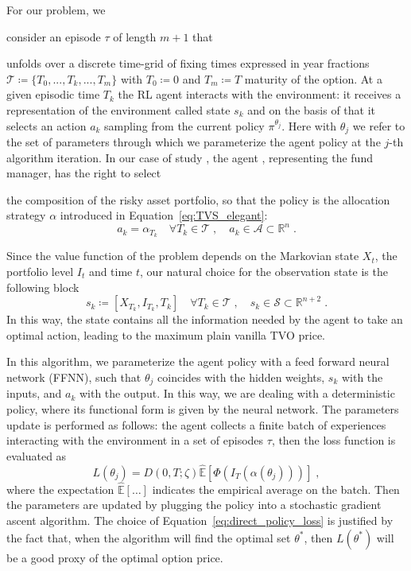 \documentclass[runningheads]{m2ef}
\newcommand\soutpars[1]{\let\helpcmd\sout\parhelp#1\par\relax\relax}
\newcommand{\change}[1]{{\color{red} {#1}}}%
\newcommand{\remove}[1]{{\color{red} \soutpars{{#1}}}}%
\begin{document}
\change{For our problem, we} \remove{We} consider an episode $\tau$ of length $m+1$ that \remove{takes place on} \change{unfolds over} a discrete time-grid of fixing times expressed in year fractions $\mathcal{T}\coloneqq \{T_0,...,T_k,...,T_m\}$ with $T_0\coloneqq 0$ and $T_m \coloneqq T$ maturity of the option. At a given episodic time $T_k$ the RL agent interacts with the environment: it receives a representation of the environment called state $s_k$ and on the basis of that it selects an action $a_k$ sampling from the current policy $\pi^{\theta_j}$. Here with $\theta_j$ we refer to the set of parameters through which we parameterize the agent policy at the $j$-th algorithm iteration. In our case of study\change{,} the agent\change{, representing the fund manager, has the right to select} \remove{can choose} the composition of the risky asset portfolio, so that the policy is the allocation strategy $\alpha$ introduced in Equation~\eqref{eq:TVS_elegant}:
\begin{equation}
 	a_k = \alpha_{T_k} \quad \forall T_k \in \mathcal{T} \; , \quad a_k \in \mathcal{A}\subset \mathbb{R}^n \; .
\label{eq:action}\end{equation} 

Since the value function of the problem depends on the Markovian state $X_t$, the portfolio level $I_t$ and time $t$, our natural choice for the observation state is the following block
\begin{equation}
 	s_{k} \coloneqq \left[X_{T_k}, I_{T_k}, T_k \right] \quad \forall T_k \in \mathcal{T} \; , \quad s_k \in \mathcal{S} \subset \mathbb{R}^{n+2} \; .
\label{eq:state}\end{equation}
In this way, the state contains all the information needed by the agent to take an optimal action, leading to the maximum plain vanilla TVO price. 

In this algorithm, we parameterize the agent policy with a feed forward neural network (FFNN), such that $\theta_j$ coincides with the hidden weights, $s_k$ with the inputs, and $a_k$ with the output. In this way, we are dealing with a deterministic policy, where its functional form is given by the neural network. The parameters update is performed as follows: the agent collects a finite batch of experiences interacting with the environment in a set of episodes $\tau$, then the loss function is evaluated as
\begin{equation}
L(\theta_j) = D(0,T;\zeta)\hat{\mathbb{E}}\left[ \Phi(I_T(\alpha(\theta_j))) \right] \; ,
\label{eq:direct_policy_loss}\end{equation}  
where the expectation $\hat{\mathbb{E}}[\dots]$ indicates the empirical average on the batch. Then the parameters are updated by plugging the policy into a stochastic gradient ascent algorithm. The choice of Equation~\eqref{eq:direct_policy_loss} is justified by the fact that, when the algorithm will find the optimal set $\theta^*$, then $L(\theta^*)$ will be a good proxy of the optimal option price. 
\end{document}
